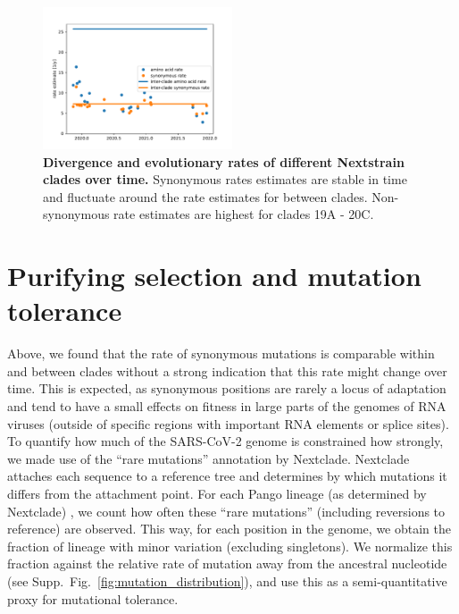 \documentclass[aps,rmp, twocolumn]{revtex4}
\begin{document}
\begin{figure}
    \includegraphics[width=0.5\textwidth]{figures/rate_progression.pdf}
    \caption{{\bf Divergence and evolutionary rates of different Nextstrain clades over time.} Synonymous rates estimates are stable in time and fluctuate around the rate estimates for between clades. Non-synonymous rate estimates are highest for clades 19A - 20C.
    \label{fig:rate_progression} }
\end{figure}




\section*{Purifying selection and mutation tolerance}

Above, we found that the rate of synonymous mutations is comparable within and between clades without a strong indication that this rate might change over time.
This is expected, as synonymous positions are rarely a locus of adaptation and tend to have a small effects on fitness in large parts of the genomes of RNA viruses \citep{zanini_vivo_2017} (outside of specific regions with important RNA elements or splice sites).
To quantify how much of the SARS-CoV-2 genome is constrained how strongly, we made use of the ``rare mutations'' annotation by Nextclade.
Nextclade attaches each sequence to a reference tree and determines by which mutations it differs from the attachment point.
For each Pango lineage (as determined by Nextclade) \citep{rambaut_dynamic_2020,aksamentov_nextclade_2021}, we count how often these ``rare mutations'' (including reversions to reference) are observed.
This way, for each position in the genome, we obtain the fraction of lineage with minor variation (excluding singletons).
We normalize this fraction against the relative rate of mutation away from the ancestral nucleotide (see Supp.~Fig.~\ref{fig:mutation_distribution}), and use this as a semi-quantitative proxy for mutational tolerance.
\end{document}
